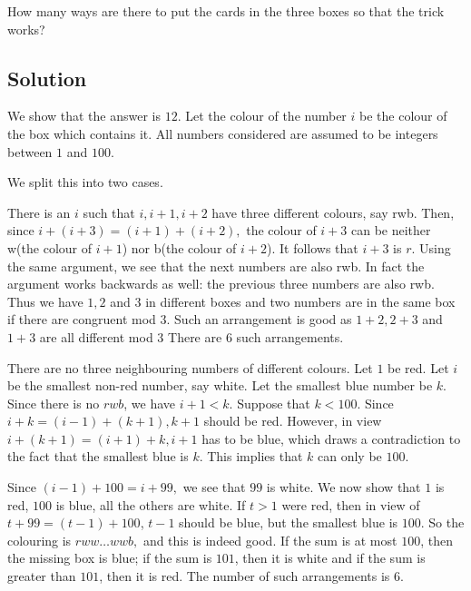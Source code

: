 \documentclass[mast]{lucky}
\begin{document}
How many ways are there to put the cards in the three boxes so that the trick works?

\subsection{Solution}

We show that the answer is $12$. Let the colour of the number $i$ be the colour of the box which contains it. All numbers considered are assumed to be integers between $1$ and $100$.

We split this into two cases.

\begin{itemize}
    \Item There is an $i$ such that $i, i + 1, i + 2$ have three different colours, say rwb. Then, since $i + (i + 3) = (i + 1) + (i + 2),$ the colour of $i + 3$ can be neither w(the colour of $i + 1$) nor b(the colour of $i + 2$). It follows that $i + 3$ is $r$. Using the same argument, we see that the next numbers are also rwb. In fact the argument works backwards as well: the previous three numbers are also rwb. Thus we have $1, 2$ and $3$ in different boxes and two numbers are in the same box if there are congruent mod $3$. Such an arrangement is good as $1 + 2, 2 + 3$ and $1 + 3 $ are all different mod $3$ There are $6$ such arrangements.

    \Item There are no three neighbouring numbers of different colours. Let $1$ be red. Let $i$ be the smallest non-red number, say white. Let the smallest blue number be $k$. Since there is no $rwb$, we have $i + 1 < k.$ Suppose that $k < 100$. Since $i + k = (i - 1) + (k + 1), k + 1$ should be red. However, in view  $i + (k + 1) = (i + 1) + k, i + 1$ has to be blue, which draws a contradiction to the fact that the smallest blue is $ k$. This implies that $k$ can only be $100$.

Since $(i - 1) + 100 = i + 99,$ we see that $99$ is white. We now show that $1$ is red, $100$ is blue, all the others are white. If $t > 1$ were red, then in view of $t + 99 = (t - 1) + 100$, $t - 1$ should be blue, but the smallest blue is $100.$ So the colouring is $rww\ldots wwb,$ and this is indeed good. If the sum is at most $100$, then the missing box is blue; if the sum is $101$, then it is white and if the sum is greater than $101$, then it is red. The number of such arrangements is $6$.
\end{itemize}
 
\end{document}
